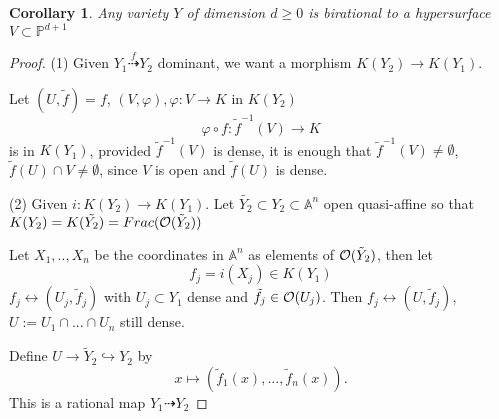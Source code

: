\documentclass[11pt]{article}
\newtheorem{cor}[thm]{Corollary}
\newcommand{\affn}{\mathbb A}
\newcommand{\proj}{\mathbb P}
\newcommand{\calo}{{\cal O}}
\newcommand{\lrta}{\longrightarrow}
\newcommand{\llrta}{\longleftrightarrow}
\newcommand{\inj}{\hookrightarrow}
\begin{document}
\begin{cor}
Any variety $Y$ of dimension $d\geq 0$ is birational to a hypersurface $V\subset \proj^{d+1}$
\end{cor}
\begin{proof}
(1) Given $Y_1\overset{f}{\dashrightarrow}Y_2$ dominant, we want a morphism
$K(Y_2)\lrta K(Y_1)$.

 Let $(U,\tilde{f})=f$, $(V,\varphi),\varphi:V\lrta K$ in $K(Y_2)$
$$
\varphi\circ f: \tilde{f}^{-1}(V)\lrta K
$$ 
 is in $K(Y_1)$, provided $\tilde{f}^{-1}(V)$ is dense, it is enough that $\tilde{f}^{-1}(V)\neq \emptyset$, $\tilde{f}(U)\cap V\neq \emptyset$, since $V$ is open and $\tilde{f}(U)$ is dense.

 (2) Given $i: K(Y_2)\lrta K(Y_1)$. Let $\tilde{Y_2}\subset Y_2\subset \affn^n$ open quasi-affine so that $K(Y_2)=K(\tilde{Y_2})=Frac(\calo(\tilde{Y}_2))$

 Let $X_1,..,X_n$ be the coordinates  in $\affn^n$ as elements of $\calo(\tilde{Y}_2)$, then let
 $$
f_j =i (X_j)\in K(Y_1)
 $$
 $f_j\llrta (U_j,\tilde{f}_j)$ with $U_j\subset Y_1$ dense and $\tilde{f}_j\in\calo(U_j)$. Then 
 $f_j\llrta (U,\tilde{f}_j)$, $U:=U_1\cap ...\cap U_n$ still dense.

 Define $U\lrta \tilde{Y}_2\inj Y_2$ by
 $$
x\longmapsto (\tilde{f}_1(x),...,\tilde{f}_n(x)).
 $$
This is a rational map $Y_1\dashrightarrow Y_2$

\end{proof}
\end{document}
